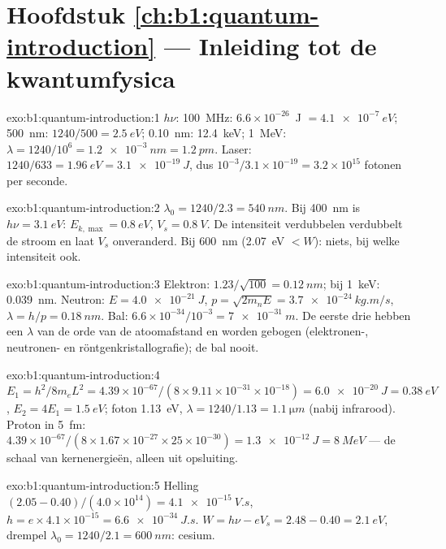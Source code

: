 \section*{Hoofdstuk \ref{ch:b1:quantum-introduction} --- Inleiding tot de kwantumfysica}

\begin{solution}{exo:b1:quantum-introduction:1}
$h\nu$: \qty{100}{MHz}: $6.6 \times 10^{-26}$~J $= \qty{4.1e-7}{eV}$; \qty{500}{nm}:
$1240/500 = \qty{2.5}{eV}$; \qty{0.10}{nm}: \qty{12.4}{keV}; \qty{1}{MeV}: $\lambda =
1240/10^6 = \qty{1.2e-3}{nm} = \qty{1.2}{pm}$. Laser: $1240/633 = \qty{1.96}{eV} =
\qty{3.1e-19}{J}$, dus $10^{-3}/3.1 \times 10^{-19} = 3.2 \times 10^{15}$ fotonen per
seconde.
\end{solution}

\begin{solution}{exo:b1:quantum-introduction:2}
$\lambda_0 = 1240/2.3 = \qty{540}{nm}$. Bij \qty{400}{nm} is $h\nu = \qty{3.1}{eV}$:
$E_{k,\max} = \qty{0.8}{eV}$, $V_s = \qty{0.8}{V}$. De intensiteit verdubbelen
verdubbelt de stroom en laat $V_s$ onveranderd. Bij \qty{600}{nm}
(\qty{2.07}{eV} $< W$): niets, bij welke intensiteit ook.
\end{solution}

\begin{solution}{exo:b1:quantum-introduction:3}
Elektron: $1.23/\sqrt{100} = \qty{0.12}{nm}$; bij \qty{1}{keV}: \qty{0.039}{nm}.
Neutron: $E = \qty{4.0e-21}{J}$, $p = \sqrt{2m_nE} = \qty{3.7e-24}{kg.m/s}$,
$\lambda = h/p = \qty{0.18}{nm}$. Bal: $6.6 \times 10^{-34}/10^{-3} = \qty{7e-31}{m}$.
De eerste drie hebben een $\lambda$ van de orde van de atoomafstand en worden
gebogen (elektronen-, neutronen- en röntgenkristallografie); de bal nooit.
\end{solution}

\begin{solution}{exo:b1:quantum-introduction:4}
$E_1 = h^2/8m_eL^2 = 4.39 \times 10^{-67}/(8 \times 9.11 \times 10^{-31} \times 10^{-18}) =
\qty{6.0e-20}{J} = \qty{0.38}{eV}$, $E_2 = 4E_1 = \qty{1.5}{eV}$; foton
\qty{1.13}{eV}, $\lambda = 1240/1.13 = \qty{1.1}{\micro m}$ (nabij infrarood). Proton
in \qty{5}{fm}: $4.39 \times 10^{-67}/(8 \times 1.67 \times 10^{-27} \times 25 \times 10^{-30}) =
\qty{1.3e-12}{J} = \qty{8}{MeV}$ --- de schaal van kernenergieën, alleen
uit opsluiting.
\end{solution}

\begin{solution}{exo:b1:quantum-introduction:5}
Helling $(2.05 - 0.40)/(4.0 \times 10^{14}) = \qty{4.1e-15}{V.s}$, $h = e \times 4.1 \times
10^{-15} = \qty{6.6e-34}{J.s}$. $W = h\nu - eV_s = 2.48 - 0.40 = \qty{2.1}{eV}$,
drempel $\lambda_0 = 1240/2.1 = \qty{600}{nm}$: cesium.
\end{solution}

